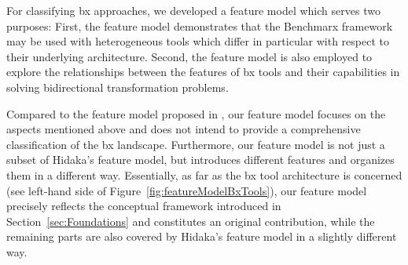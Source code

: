 \cite{DBLP:conf/sattose/EramoMP14}

For classifying bx approaches, we developed a feature model which serves two purposes: First, the feature model demonstrates that the Benchmarx framework may be used with heterogeneous tools which differ in particular with respect to their underlying architecture. Second, the feature model is also employed to explore the relationships between the features of bx tools and their capabilities in solving bidirectional transformation problems. 

Compared to the feature model proposed in \cite{SOSYM-Hidaka2016}, our feature model focuses on the aspects mentioned above and does not intend to provide a comprehensive classification of the bx landscape. Furthermore, our feature model is not just a subset of Hidaka's feature model, but introduces different features and organizes them in a different way. Essentially, as far as the bx tool architecture is concerned (see left-hand side of Figure~\ref{fig:featureModelBxTools}), our feature model precisely reflects the conceptual framework introduced in Section~\ref{sec:Foundations} and constitutes an original contribution, while the remaining parts are also covered by Hidaka's feature model in a slightly different way.

\cite{DBLP:journals/jss/DiskinGWC16}

\cite{DBLP:conf/sle/Lammel16}

